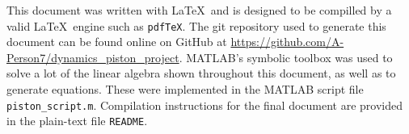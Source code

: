 \documentclass[nofoot,pdf-a,balance,colorlinks,upint,subscriptcorrection,varvw,mathalfa=cal=boondoxo]{asmeconf}
\begin{document}
    This document was written with \LaTeX\ and is designed to be compilled by a valid \LaTeX\ engine such as \texttt{pdfTeX}. The git repository used to generate this document can be found online on GitHub at \href{https://github.com/A-Person7/dynamics_piston_project}{https://github.com/A-Person7/dynamics_piston_project}. MATLAB's symbolic toolbox was used to solve a lot of the linear algebra shown throughout this document, as well as to generate equations. These were implemented in the MATLAB script file \texttt{piston_script.m}. Compilation instructions for the final document are provided in the plain-text file \texttt{README}.


    
\end{document}

